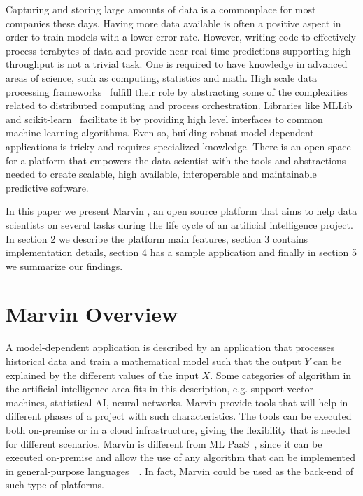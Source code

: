 \documentclass[twoside,11pt]{article}
\begin{document}
Capturing and storing large amounts of data is a commonplace for most companies these days. Having more data available is often a positive aspect in order to train models with a lower error rate. However, writing code to effectively process terabytes of data and provide near-real-time predictions supporting high throughput is not a trivial task. One is required to have knowledge in advanced areas of science, such as computing, statistics and math. High scale data processing frameworks~\citep{zaharia2010spark} fulfill their role by abstracting some of the complexities related to distributed computing and process orchestration. Libraries like MLLib~\citep{meng2015ml} and scikit-learn~\citep{pedregosa2011scikit} facilitate it by providing high level interfaces to common machine learning algorithms. Even so, building robust model-dependent applications is tricky and requires specialized knowledge. There is an open space for a platform that empowers the data scientist with the tools and abstractions needed to create scalable, high available, interoperable and maintainable predictive software. 

In this paper we present Marvin \citep{marvingit}, an open source platform that aims to help data scientists on several tasks during the life cycle of an artificial intelligence project. In section 2 we describe the platform main features, section 3 contains implementation details, section 4 has a sample application and finally in section 5 we summarize our findings.

\section{Marvin Overview}

A model-dependent application is described by an application that processes historical data and train a mathematical model such that the output $Y$ can be explained by the different values of the input $X$. Some categories of algorithm in the artificial intelligence area fits in this description, e.g. support vector machines, statistical AI, neural networks. Marvin provide tools that will help in different phases of a project with such characteristics. The tools can be executed both on-premise or in a cloud infrastructure, giving the flexibility that is needed for different scenarios. Marvin is different from ML PaaS~\citep{pmlr-v50-azureml15}, since it can be executed on-premise and allow the use of any algorithm that can be implemented in general-purpose languages~\citep{van2003python}~\citep{odersky2004scala}. In fact, Marvin could be used as the back-end of such type of platforms.
\end{document}
